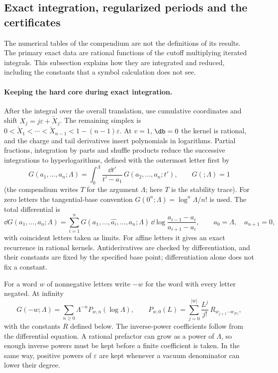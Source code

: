 \subsection{Exact integration, regularized periods and the certificates}\label{sri:app:dualC:certificates}
The numerical tables of the compendium are not the definitions of its results. The primary exact data are rational
functions of the cutoff multiplying iterated integrals. This subsection explains how they are integrated and reduced,
including the constants that a symbol calculation does not see.

\paragraph{Keeping the hard core during exact integration.} After the integral over the overall translation, use
cumulative coordinates and shift $X_j=j\varepsilon+\tilde X_j$. The remaining simplex is
$0<\tilde X_1<\cdots<\tilde X_{n-1}<1-(n-1)\varepsilon$. At $v=1$, $\db=0$ the kernel is rational, and the charge and tail
derivatives insert polynomials in logarithms. Partial fractions, integration by parts and shuffle products reduce the
successive integrations to hyperlogarithms, defined with the outermost letter first by
\begin{equation}
 G(a_1,\ldots,a_n;\Lambda)=\int_0^\Lambda\frac{\dd t'}{t'-a_1}\,G(a_2,\ldots,a_n;t'),\qquad G(;\Lambda)=1
 \label{sri:eq:dualC:gpl}
\end{equation}
(the compendium writes $T$ for the argument $\Lambda$; here $T$ is the stability trace). For zero letters the
tangential-base convention $G(0^n;\Lambda)=\log^n\Lambda/n!$ is used. The total differential is
\begin{equation}
 \dd G(a_1,\ldots,a_n;\Lambda)=\sum_{i=1}^nG(a_1,\ldots,\widehat{a_i},\ldots,a_n;\Lambda)\,
 \dd\log\frac{a_{i-1}-a_i}{a_{i+1}-a_i},\qquad a_0=\Lambda,\quad a_{n+1}=0,
 \label{sri:eq:dualC:totaldiff}
\end{equation}
with coincident letters taken as limits. For affine letters it gives an exact recurrence in rational kernels.
Antiderivatives are checked by differentiation, and their constants are fixed by the specified base point;
differentiation alone does not fix a constant.

For a word $w$ of nonnegative letters write $-w$ for the word with every letter negated. At infinity
\begin{equation}
 G(-w;\Lambda)=\sum_{n\ge0}\Lambda^{-n}P_{w,n}(\log\Lambda),\qquad
 P_{w,0}(L)=\sum_{j=0}^{|w|}\frac{L^j}{j!}\,R_{w_{j+1}\cdots w_{|w|}},
 \label{sri:eq:dualC:infinity}
\end{equation}
with the constants $R$ defined below. The inverse-power coefficients follow from the differential equation. A rational
prefactor can grow as a power of $\Lambda$, so enough inverse powers must be kept before a finite coefficient is taken.
In the same way, positive powers of $\varepsilon$ are kept whenever a vacuum denominator can lower their degree.

